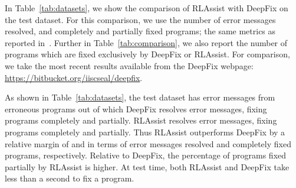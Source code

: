 \documentclass{article}
\begin{document}
\begin{table}[t]
	\centering
	\caption{Comparison of DeepFix and RLAssist on the number of programs fixed exclusively by each technique.}
	\label{tab:comparison}
\end{table}

In Table~\ref{tab:datasets}, we show the comparison of RLAssist with DeepFix on the test dataset.
For this comparison, we use the number of error messages resolved, and completely and partially fixed programs; the same metrics as reported in~\cite{gupta2017deepfix}.
Further in Table~\ref{tab:comparison}, we also report the number of programs which are fixed exclusively by DeepFix or RLAssist.
For comparison, we take the most recent results available from the DeepFix webpage: {\small{\url{https://bitbucket.org/iiscseal/deepfix}}}.

As shown in Table~\ref{tab:datasets}, the test dataset has  error messages from  erroneous programs out of which DeepFix resolves  error messages, fixing  programs completely and  partially.
RLAssist resolves  error messages, fixing  programs completely and  partially.
Thus RLAssist outperforms DeepFix by a relative margin of  and  in terms of error messages resolved and completely fixed programs, respectively.
Relative to DeepFix, the percentage of programs fixed partially by RLAssist is  higher.
At test time, both RLAssist and DeepFix take less than a second to fix a program.
\end{document}

